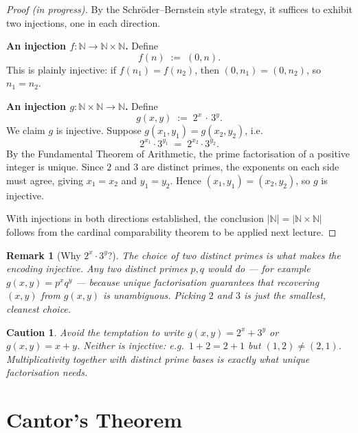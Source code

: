\documentclass[11pt]{article}
\theoremstyle{defstyle}
\theoremstyle{thmstyle}
\theoremstyle{notstyle}
\newtheorem*{remark}{Remark}
\theoremstyle{cautionstyle}
\newtheorem*{caution}{Caution}
\newcommand{\N}{\mathbb{N}}
\begin{document}
\begin{proof}[Proof (in progress)]
By the Schr\"oder--Bernstein style strategy, it suffices to exhibit two
injections, one in each direction.

\medskip
\noindent\textbf{An injection $f : \N \to \N \times \N$.} Define
\[
  f(n) \;:=\; (0, n).
\]
This is plainly injective: if $f(n_1) = f(n_2)$, then $(0, n_1) = (0, n_2)$,
so $n_1 = n_2$.

\medskip
\noindent\textbf{An injection $g : \N \times \N \to \N$.} Define
\[
  g(x, y) \;:=\; 2^{x}\,\cdot\,3^{y}.
\]
We claim $g$ is injective. Suppose $g(x_1, y_1) = g(x_2, y_2)$, i.e.
\[
  2^{x_1} \cdot 3^{y_1} \;=\; 2^{x_2} \cdot 3^{y_2}.
\]
By the Fundamental Theorem of Arithmetic, the prime factorisation of a positive
integer is unique. Since $2$ and $3$ are distinct primes, the exponents on
each side must agree, giving $x_1 = x_2$ and $y_1 = y_2$. Hence
$(x_1, y_1) = (x_2, y_2)$, so $g$ is injective.

\medskip
With injections in both directions established, the conclusion
$|\N| = |\N \times \N|$ follows from the cardinal comparability theorem to be
applied next lecture. \qedhere
\end{proof}

\begin{notebox}
\begin{remark}[Why $2^{x} \cdot 3^{y}$?]
The choice of two distinct primes is what makes the encoding injective. Any two
distinct primes $p, q$ would do --- for example $g(x, y) = p^{x} q^{y}$ ---
because unique factorisation guarantees that recovering $(x, y)$ from
$g(x, y)$ is unambiguous. Picking $2$ and $3$ is just the smallest, cleanest
choice.
\end{remark}
\end{notebox}

\begin{cautionbox}
\begin{caution}
Avoid the temptation to write $g(x, y) = 2^{x} + 3^{y}$ or
$g(x, y) = x + y$. Neither is injective: e.g.\ $1 + 2 = 2 + 1$ but
$(1, 2) \neq (2, 1)$. Multiplicativity together with distinct prime bases is
exactly what unique factorisation needs.
\end{caution}
\end{cautionbox}

\section{Cantor's Theorem}
\end{document}

